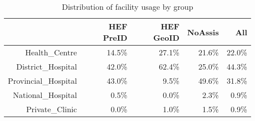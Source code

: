 \begin{table}[ht]
\centering
\begin{tabular}{rrrrr}
  \hline
 & HEF PreID & HEF GeoID & NoAssis & All \\ 
  \hline
Health\_Centre & 14.5\% & 27.1\% & 21.6\% & 22.0\% \\ 
  District\_Hospital & 42.0\% & 62.4\% & 25.0\% & 44.3\% \\ 
  Provincial\_Hospital & 43.0\% & 9.5\% & 49.6\% & 31.8\% \\ 
  National\_Hospital & 0.5\% & 0.0\% & 2.3\% & 0.9\% \\ 
  Private\_Clinic & 0.0\% & 1.0\% & 1.5\% & 0.9\% \\ 
   \hline
\end{tabular}
\caption{Distribution of facility usage by group} 
\end{table}
